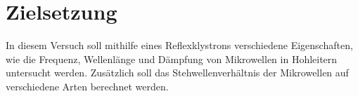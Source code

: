 \section{Zielsetzung}
In diesem Versuch soll mithilfe eines Reflexklystrons verschiedene Eigenschaften,
wie die Frequenz, Wellenlänge und Dämpfung von Mikrowellen in Hohleitern
untersucht werden. Zusätzlich soll das Stehwellenverhältnis der Mikrowellen auf
verschiedene Arten berechnet werden.



\label{sec:Zielsetzung}
